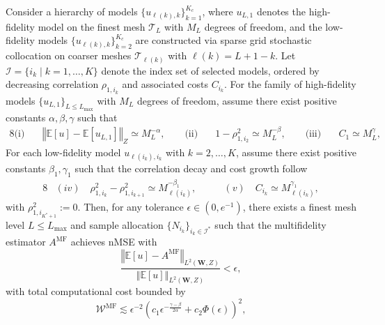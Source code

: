 %
\begin{theorem}\label{thm:Sample_cost_est}
Consider a hierarchy of models $\{u_{\ell(k),k}\}_{k=1}^{K_c}$, where $u_{L,1}$ denotes the high-fidelity model on the finest mesh $\mathcal{T}_L$ with $M_L$ degrees of freedom, and the low-fidelity models $\{u_{\ell(k),k}\}_{k=2}^{K_c}$ are constructed via sparse grid stochastic collocation on coarser meshes $\mathcal{T}_{\ell(k)}$ with $\ell(k) = L + 1 - k$. Let $\mathcal{I} = \{i_k \mid k = 1, \dots, K\}$ denote the index set of selected models, ordered by decreasing correlation $\rho_{1,i_k}$ and associated costs $C_{i_k}$. For the family of high-fidelity models $\{u_{L,1}\}_{L\le L_{\max}}$ with $M_L$ degrees of freedom, assume  there exist positive constants $\alpha, \beta, \gamma$ such that
%
\begin{alignat*}{8}
    \text{(i)}\quad & \left\Vert \mathbb{E}[u] - \mathbb{E}[u_{L,1}] \right\Vert_Z \simeq M_L^{-\alpha}, \qquad
    \text{(ii)}\quad & 1 - \rho_{1,i_2}^2 \simeq M_L^{-\beta}, \qquad
    \text{(iii)}\quad & C_1 \simeq M_L^{\gamma},
\end{alignat*}
%
For each low-fidelity model $u_{\ell(i_k),i_k}$ with $k = 2, \dots, K$, assume there exist positive constants $\beta_1, \gamma_1$ such that the correlation decay and cost growth follow
%
\begin{alignat*}{8}
    &(iv)\quad \rho_{1,i_k}^2-\rho_{1,i_{k+1}}^2 \simeq M_{\ell(i_k)}^{-\beta_1},
    \qquad
&(v)\quad C_{i_k} \simeq M_{\ell(i_k)}^{\gamma_1},
\end{alignat*}
%
with $\rho_{1,i_{K^*+1}}^2 := 0$. Then, for any tolerance $\epsilon \in (0, e^{-1})$, there exists a finest mesh level $L \le L_{\max}$ and sample allocation $\{N_{i_k}\}_{i_k \in \mathcal{I}^*}$ such that the multifidelity estimator $A^{\mathrm{MF}}$ achieves nMSE  with
%
\[
\frac{\left\Vert \mathbb{E}[u] - A^{\mathrm{MF}} \right\Vert_{L^2(\boldsymbol{W},Z)}}{\left\Vert \mathbb{E}[u] \right\Vert_{L^2(\boldsymbol{W},Z)}} < \epsilon,
\]
%
with total computational cost bounded by
%
\begin{equation}\label{eq:lfm_scaling}
\mathcal{W}^{\mathrm{MF}} \lesssim \epsilon^{-2} \left( c_1 \epsilon^{-\frac{\gamma-\beta}{2\alpha}} + c_2 \Phi(\epsilon) \right)^2,\qquad 

\end{equation}
\end{theorem}
